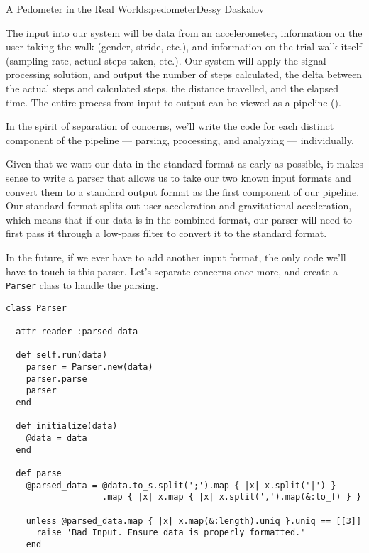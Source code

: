 \begin{aosachapter}{A Pedometer in the Real World}{s:pedometer}{Dessy Daskalov}
\label{the-pipeline}

The input into our system will be data from an accelerometer,
information on the user taking the walk (gender, stride, etc.), and
information on the trial walk itself (sampling rate, actual steps taken,
etc.). Our system will apply the signal processing solution, and output
the number of steps calculated, the delta between the actual steps and
calculated steps, the distance travelled, and the elapsed time. The
entire process from input to output can be viewed as a pipeline
().


In the spirit of separation of concerns, we'll write the code for each
distinct component of the pipeline --- parsing, processing, and
analyzing --- individually.

\label{parsing}

Given that we want our data in the standard format as early as possible,
it makes sense to write a parser that allows us to take our two known
input formats and convert them to a standard output format as the first
component of our pipeline. Our standard format splits out user
acceleration and gravitational acceleration, which means that if our
data is in the combined format, our parser will need to first pass it
through a low-pass filter to convert it to the standard format.


In the future, if we ever have to add another input format, the only
code we'll have to touch is this parser. Let's separate concerns once
more, and create a \texttt{Parser} class to handle the parsing.

\begin{verbatim}
class Parser

  attr_reader :parsed_data

  def self.run(data)
    parser = Parser.new(data)
    parser.parse
    parser
  end

  def initialize(data)
    @data = data
  end

  def parse
    @parsed_data = @data.to_s.split(';').map { |x| x.split('|') }
                   .map { |x| x.map { |x| x.split(',').map(&:to_f) } }

    unless @parsed_data.map { |x| x.map(&:length).uniq }.uniq == [[3]]
      raise 'Bad Input. Ensure data is properly formatted.'
    end


\end{verbatim}
\end{aosachapter}
